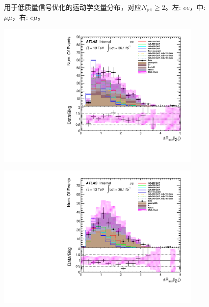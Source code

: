\begin{figure}[h]
\begin{minipage}[t]{0.33\linewidth}
 \end{minipage}
 \caption{用于低质量信号优化的运动学变量分布，对应$N_{\text{jet}}\geq2$。左: $ee$，中: $\mu\mu$，右: $e\mu$。}
\label{fig:SigOpt_low_kine}
\end{figure}

\begin{figure}[h]
 \begin{minipage}[t]{0.33\linewidth}
 \centering
 \includegraphics[width=0.9\textwidth,angle=-90]{fig/dataMC_high_Njet_CR/mindR_l2j_ee.pdf}\label{fig:dataMC_high_Njet_CR:mindRl2j_ee.pdf}
 \end{minipage}
 \begin{minipage}[t]{0.33\linewidth}
 \centering
 \includegraphics[width=0.9\textwidth,angle=-90]{fig/dataMC_high_Njet_CR/mindR_l2j_mumu.pdf}\label{fig:dataMC_high_Njet_CR:mindRl2j_mumu.pdf}

\end{minipage}
\end{figure}
